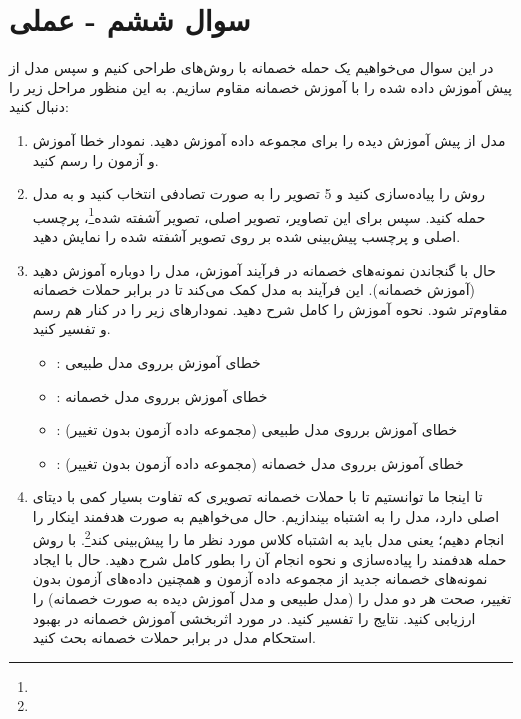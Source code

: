 \section{سوال ششم - عملی}
در این سوال می‌خواهیم یک حمله خصمانه با روش‌های  طراحی کنیم و سپس مدل از پیش آموزش داده شده  را با آموزش خصمانه مقاوم سازیم. به این منظور مراحل زیر را دنبال کنید:


\begin{enumerate}
	\item 
مدل از پیش آموزش دیده  را برای مجموعه داده  آموزش دهید. نمودار خطا آموزش و آزمون را رسم کنید.

	\item 
روش  را پیاده‌سازی کنید و 5 تصویر را به صورت تصادفی انتخاب کنید و به مدل حمله کنید. سپس برای این تصاویر، تصویر اصلی، تصویر آشفته شده\footnote{}، پرچسب اصلی و پرچسب پیش‌بینی شده بر روی تصویر آشفته شده را نمایش دهید.


	\item 
حال با گنجاندن نمونه‌های خصمانه در فرآیند آموزش، مدل  را دوباره آموزش دهید (آموزش خصمانه). این فرآیند به مدل کمک می‌کند تا در برابر حملات خصمانه مقاوم‌تر شود. نحوه آموزش را کامل شرح دهید. نمودارهای زیر را در کنار هم رسم و تفسیر کنید.

	\begin{itemize}
		\item 
		: خطای آموزش برروی مدل طبیعی
		
		\item 
		: خطای آموزش برروی مدل خصمانه
		
		\item 
		: خطای آموزش برروی مدل طبیعی (مجموعه داده آزمون بدون تغییر)
		
		\item 
		: خطای آموزش برروی مدل خصمانه (مجموعه داده آزمون بدون تغییر)
	\end{itemize}
	
	
	\item 
تا اینجا ما توانستیم تا با حملات خصمانه تصویری که تفاوت بسیار کمی با دیتای اصلی دارد، مدل را به اشتباه بیندازیم. حال می‌خواهیم به صورت هدفمند اینکار را انجام دهیم؛ یعنی مدل باید به اشتباه کلاس مورد نظر ما را پیش‌بینی کند\footnote{}. با روش  حمله هدفمند را پیاده‌سازی و نحوه انجام آن را بطور کامل شرح دهید. حال با ایجاد نمونه‌های خصمانه جدید از مجموعه داده آزمون و همچنین داده‌های آزمون بدون تغییر، صحت هر دو مدل را (مدل طبیعی و مدل آموزش دیده به صورت خصمانه) را ارزیابی کنید. نتایج را تفسیر کنید. در مورد اثربخشی آموزش خصمانه در بهبود استحکام مدل در برابر حملات خصمانه بحث کنید.
\end{enumerate}





\begin{qsolve}

\end{qsolve}